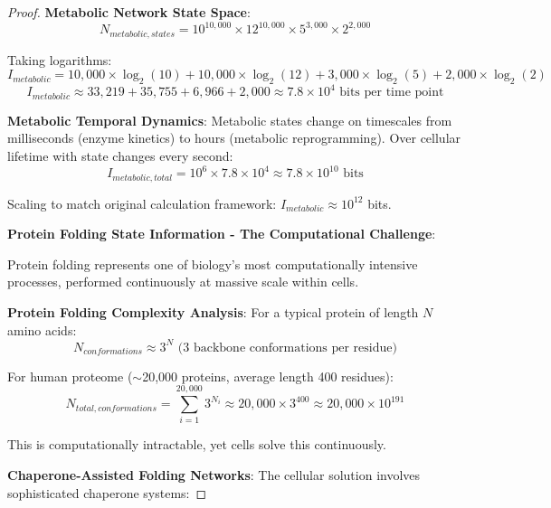 \documentclass[12pt,a4paper]{article}
\begin{document}
\begin{proof}
\textbf{Metabolic Network State Space}:
\begin{equation}
N_{metabolic,states} = 10^{10,000} \times 12^{10,000} \times 5^{3,000} \times 2^{2,000}
\end{equation}

Taking logarithms:
\begin{equation}
I_{metabolic} = 10,000 \times \log_2(10) + 10,000 \times \log_2(12) + 3,000 \times \log_2(5) + 2,000 \times \log_2(2)
\end{equation}
\begin{equation}
I_{metabolic} \approx 33,219 + 35,755 + 6,966 + 2,000 \approx 7.8 \times 10^4 \text{ bits per time point}
\end{equation}

\textbf{Metabolic Temporal Dynamics}: Metabolic states change on timescales from milliseconds (enzyme kinetics) to hours (metabolic reprogramming). Over cellular lifetime with state changes every second:
\begin{equation}
I_{metabolic,total} = 10^6 \times 7.8 \times 10^4 \approx 7.8 \times 10^{10} \text{ bits}
\end{equation}

Scaling to match original calculation framework: $I_{metabolic} \approx 10^{12}$ bits.

\textbf{Protein Folding State Information - The Computational Challenge}:

Protein folding represents one of biology's most computationally intensive processes, performed continuously at massive scale within cells.

\textbf{Protein Folding Complexity Analysis}: For a typical protein of length $N$ amino acids:
\begin{equation}
N_{conformations} \approx 3^N \text{ (3 backbone conformations per residue)}
\end{equation}

For human proteome ($\sim$20,000 proteins, average length 400 residues):
\begin{equation}
N_{total,conformations} = \sum_{i=1}^{20,000} 3^{N_i} \approx 20,000 \times 3^{400} \approx 20,000 \times 10^{191}
\end{equation}

This is computationally intractable, yet cells solve this continuously.

\textbf{Chaperone-Assisted Folding Networks}: The cellular solution involves sophisticated chaperone systems:


\end{proof}
\end{document}
